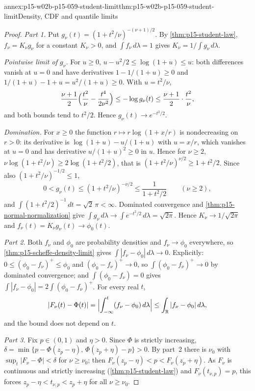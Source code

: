 \begin{annexitem}{annex:p15-w02b-p15-059-student-limit}{thm:p15-w02b-p15-059-student-limit}{Density, CDF and quantile limits}
\begin{proof}
\emph{Part 1.} Put \(g_\nu(t)=(1+t^2/\nu)^{-(\nu+1)/2}\). By
\cref{thm:p15-student-law}, \(f_\nu=K_\nu g_\nu\) for a constant
\(K_\nu>0\), and \(\int f_\nu\,d\lambda=1\) gives
\(K_\nu=1/\int g_\nu\,d\lambda\).

\emph{Pointwise limit of \(g_\nu\).} For \(u\geq0\),
\(u-u^2/2\leq\log(1+u)\leq u\): both differences vanish at \(u=0\) and
have derivatives \(1-1/(1+u)\geq0\) and \(1/(1+u)-1+u=u^2/(1+u)\geq0\).
With \(u=t^2/\nu\),
\[
 \frac{\nu+1}2\Bigl(\frac{t^2}\nu-\frac{t^4}{2\nu^2}\Bigr)
 \leq-\log g_\nu(t)\leq\frac{\nu+1}2\cdot\frac{t^2}\nu ,
\]
and both bounds tend to \(t^2/2\). Hence
\(g_\nu(t)\to e^{-t^2/2}\).

\emph{Domination.} For \(x\geq0\) the function
\(r\mapsto r\log(1+x/r)\) is nondecreasing on \(r>0\): its derivative is
\(\log(1+u)-u/(1+u)\) with \(u=x/r\), which vanishes at \(u=0\) and has
derivative \(u/(1+u)^2\geq0\) in \(u\). Hence for \(\nu\geq2\),
\(\nu\log(1+t^2/\nu)\geq2\log(1+t^2/2)\), that is
\((1+t^2/\nu)^{\nu/2}\geq1+t^2/2\). Since also
\((1+t^2/\nu)^{-1/2}\leq1\),
\[
 0<g_\nu(t)\leq(1+t^2/\nu)^{-\nu/2}\leq\frac1{1+t^2/2}\qquad(\nu\geq2),
\]
and \(\int(1+t^2/2)^{-1}\,dt=\sqrt2\,\pi<\infty\). Dominated convergence
and \cref{thm:p15-normal-normalization} give
\(\int g_\nu\,d\lambda\to\int e^{-t^2/2}\,d\lambda=\sqrt{2\pi}\). Hence
\(K_\nu\to1/\sqrt{2\pi}\) and \(f_\nu(t)=K_\nu g_\nu(t)\to\phi_0(t)\).

\emph{Part 2.} Both \(f_\nu\) and \(\phi_0\) are probability densities and
\(f_\nu\to\phi_0\) everywhere, so \cref{thm:p15-scheffe-density-limit} gives
\(\int|f_\nu-\phi_0|\,d\lambda\to0\). Explicitly:
\(0\leq(\phi_0-f_\nu)^+\leq\phi_0\) and \((\phi_0-f_\nu)^+\to0\), so
\(\int(\phi_0-f_\nu)^+\to0\) by dominated convergence; and
\(\int(\phi_0-f_\nu)=0\) gives
\(\int|f_\nu-\phi_0|=2\int(\phi_0-f_\nu)^+\). For every real \(t\),
\[
 |F_\nu(t)-\Phi(t)|=\Bigl|\int_{-\infty}^t(f_\nu-\phi_0)\,d\lambda\Bigr|
 \leq\int_{\mathbb R}|f_\nu-\phi_0|\,d\lambda ,
\]
and the bound does not depend on \(t\).

\emph{Part 3.} Fix \(p\in(0,1)\) and \(\eta>0\). Since \(\Phi\) is strictly
increasing, \(\delta=\min\{p-\Phi(z_p-\eta),\,\Phi(z_p+\eta)-p\}>0\). By
part~2 there is \(\nu_0\) with \(\sup_t|F_\nu-\Phi|<\delta\) for
\(\nu\geq\nu_0\); then \(F_\nu(z_p-\eta)<p<F_\nu(z_p+\eta)\). As \(F_\nu\)
is continuous and strictly increasing (\cref{thm:p15-student-law}) and
\(F_\nu(t_{\nu,p})=p\), this forces
\(z_p-\eta<t_{\nu,p}<z_p+\eta\) for all \(\nu\geq\nu_0\).
\end{proof}
\end{annexitem}

